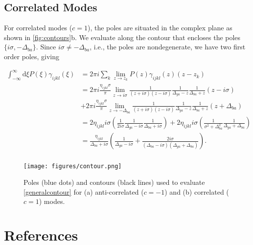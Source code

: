 \documentclass[aip, jcp, reprint, onecolumn, nofootinbib]{revtex4-2}
\begin{document}
\subsection{Correlated Modes}
For correlated modes ($c = 1$), the poles are situated in the complex plane as shown in \autoref{fig:contours}b.
We evaluate along the contour that encloses the poles $\{i\sigma, -\Delta_{ba}\}$.
Since $i\sigma \neq -\Delta_{ba}$, i.e., the poles are nondegenerate, we have two first order poles, giving
\begin{widetext}
	\begin{equation}
		\begin{split}
			\int_{-\infty}^\infty \mathrm{d}\xi P(\xi) \gamma_{ijkl}(\xi) &= 2\pi i \sum_k \lim_{z \rightarrow z_k} P(z) \gamma_{ijkl}(z) (z - z_k)\\
			&= 2\pi i \frac{\eta_{ijkl} \sigma}{\pi}  \lim_{z \rightarrow i\sigma} \frac{1}{(z + i\sigma)(z - i\sigma)} \frac{1}{\Delta_{ga} - z} \frac{1}{\Delta_{ba} + z} \left(z - i \sigma\right) \\ 
			&+ 2\pi i \frac{\eta_{ijkl} \sigma}{\pi} \lim_{z \rightarrow -\Delta_{ba}} \frac{1}{(z + i\sigma)(z - i\sigma)} \frac{1}{\Delta_{ga} - z} \frac{1}{\Delta_{ba} + z} \left(z + \Delta_{ba}\right)\\
			&= 2 \eta_{ijkl} i \sigma \left(\frac{1}{2 i \sigma} \frac{1}{\Delta_{ga} - i\sigma} \frac{1}{\Delta_{ba} + i\sigma} \right) + 2\eta_{ijkl} i \sigma \left(\frac{1}{\sigma^2 + \Delta_{ba} ^2} \frac{1}{\Delta_{ga} + \Delta_{ba}} \right)\\
			&= \frac{\eta_{ijkl}}{\Delta_{ba} + i \sigma} \left(\frac{1}{\Delta_{ga} - i \sigma} + \frac{2i\sigma}{(\Delta_{ba} - i \sigma)(\Delta_{ga} + \Delta_{ba})}\right).\\
		\end{split}
	\end{equation}
\end{widetext}


\begin{figure}[!htbp]
	\centering
	\texttt{[image: figures/contour.png]}
	\caption{Poles (blue dots) and contours (black lines) used to evaluate \autoref{generalcontour} for (a) anti-correlated ($c=-1$) and (b) correlated ($c=1$) modes. 
	} 
	\label{fig:contours}
\end{figure}

\section{References}

\end{document}

